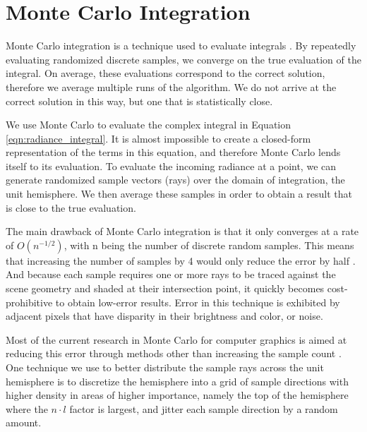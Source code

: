 \section{Monte Carlo Integration}
\label{sec:monte_carlo_integration}

Monte Carlo integration is a technique used to evaluate integrals \cite{bib:pbr}. By repeatedly evaluating randomized discrete samples, we converge on the true evaluation of the integral. On average, these evaluations correspond to the correct solution, therefore we average multiple runs of the algorithm. We do not arrive at the correct solution in this way, but one that is statistically close.

We use Monte Carlo to evaluate the complex integral in Equation \ref{eqn:radiance_integral}. It is almost impossible to create a closed-form representation of the terms in this equation, and therefore Monte Carlo lends itself to its evaluation. To evaluate the incoming radiance at a point, we can generate randomized sample vectors (rays) over the domain of integration, the unit hemisphere. We then average these samples in order to obtain a result that is close to the true evaluation.

The main drawback of Monte Carlo integration is that it only converges at a rate of $O(n^{-1/2})$, with n being the number of discrete random samples. This means that increasing the number of samples by 4 would only reduce the error by half \cite{bib:pbr}. And because each sample requires one or more rays to be traced against the scene geometry and shaded at their intersection point, it quickly becomes cost-prohibitive to obtain low-error results. Error in this technique is exhibited by adjacent pixels that have disparity in their brightness and color, or noise.

Most of the current research in Monte Carlo for computer graphics is aimed at reducing this error through methods other than increasing the sample count \cite{bib:pbr}. One technique we use to better distribute the sample rays across the unit hemisphere is to discretize the hemisphere into a grid of sample directions with higher density in areas of higher importance, namely the top of the hemisphere where the $n \cdot l$ factor is largest, and jitter each sample direction by a random amount.

